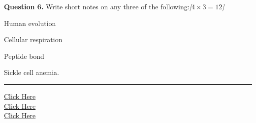\documentclass[11pt,a4paper]{article}
\newcommand{\pts}[1]{\hfill   \textit{[#1]}}
\begin{document}
\medskip


\noindent   \textbf{Question 6.} Write short notes on any three of the following:\pts{$4  \times 3 = 12$}

\begin{parts}
  \item Human evolution
  \item Cellular respiration
  \item Peptide bond
  \item Sickle cell anemia.
\end{parts}

\vfill
\rule{\linewidth}{0.4pt}

\begin{center}\small
\href{https://bhu-exam.vercel.app/}{Click Here}\\[4pt]\href{https://me-aryan.vercel.app/}{Click Here}\\[4pt]\href{https://quashan-me.vercel.app/}{Click Here}
\end{center}
\end{document}
